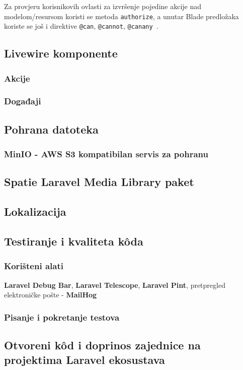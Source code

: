 Za provjeru korisnikovih ovlasti za izvršenje pojedine akcije nad modelom/resursom koristi se metoda \texttt{authorize}, a unutar Blade predložaka koriste se još i direktive \texttt{@can}, \texttt{@cannot}, \texttt{@canany}~\cite{authorization}.

\subsection{Livewire komponente}

\subsubsection{Akcije}

\subsubsection{Događaji}

\subsection{Pohrana datoteka}

\subsubsection{MinIO - AWS S3 kompatibilan servis za pohranu}

\subsection{Spatie Laravel Media Library paket}

\subsection{Lokalizacija}
\label{subsection:localization}

\subsection{Testiranje i kvaliteta k\^oda}

\subsubsection{Korišteni alati}
\textbf{Laravel Debug Bar}, \textbf{Laravel Telescope}, \textbf{Laravel Pint}, pretpregled elektroničke pošte - \textbf{MailHog}

\subsubsection{Pisanje i pokretanje testova}

\subsection{Otvoreni k\^od i doprinos zajednice na projektima Laravel ekosustava}
